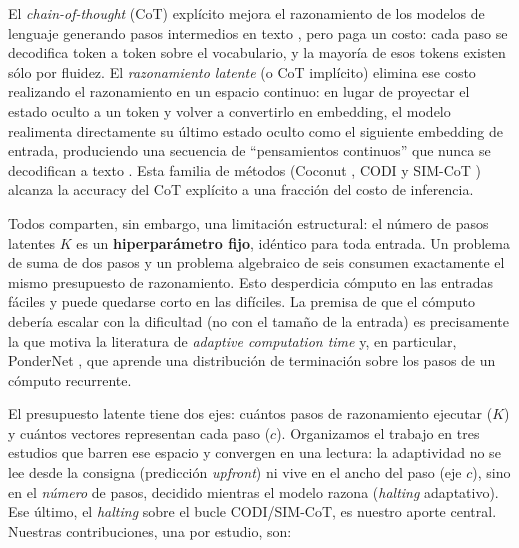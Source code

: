 \documentclass[11pt]{article}
\begin{document}
El \emph{chain-of-thought} (CoT) explícito mejora el razonamiento de los modelos de lenguaje generando pasos intermedios en texto \citep{wei2022cot}, pero paga un costo: cada paso se decodifica token a token sobre el vocabulario, y la mayoría de esos tokens existen sólo por fluidez. El \emph{razonamiento latente} (o CoT implícito) elimina ese costo realizando el razonamiento en un espacio continuo: en lugar de proyectar el estado oculto a un token y volver a convertirlo en embedding, el modelo realimenta directamente su último estado oculto como el siguiente embedding de entrada, produciendo una secuencia de ``pensamientos continuos'' que nunca se decodifican a texto \citep{hao2024coconut}. Esta familia de métodos (Coconut \citep{hao2024coconut}, CODI \citep{shen2025codi} y SIM-CoT \citep{wei2025simcot} ) alcanza la accuracy del CoT explícito a una fracción del costo de inferencia.

Todos comparten, sin embargo, una limitación estructural: el número de pasos latentes $K$ es un \textbf{hiperparámetro fijo}, idéntico para toda entrada. Un problema de suma de dos pasos y un problema algebraico de seis consumen exactamente el mismo presupuesto de razonamiento. Esto desperdicia cómputo en las entradas fáciles y puede quedarse corto en las difíciles. La premisa de que el cómputo debería escalar con la dificultad (no con el tamaño de la entrada) es precisamente la que motiva la literatura de \emph{adaptive computation time} \citep{graves2016act} y, en particular, PonderNet \citep{banino2021pondernet}, que aprende una distribución de terminación sobre los pasos de un cómputo recurrente.

El presupuesto latente tiene dos ejes: cuántos pasos de razonamiento ejecutar ($K$) y cuántos vectores representan cada paso ($c$). Organizamos el trabajo en tres estudios que barren ese espacio y convergen en una lectura: la adaptividad no se lee desde la consigna (predicción \emph{upfront}) ni vive en el ancho del paso (eje $c$), sino en el \emph{número} de pasos, decidido mientras el modelo razona (\emph{halting} adaptativo). Ese último, el \emph{halting} sobre el bucle CODI/SIM-CoT, es nuestro aporte central. Nuestras contribuciones, una por estudio, son:
\end{document}
